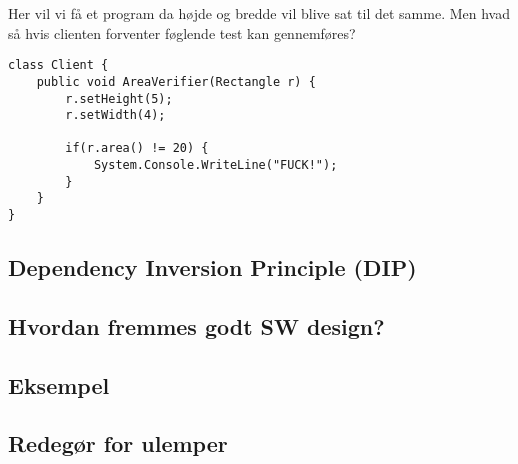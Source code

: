 Her vil vi få et program da højde og bredde vil blive sat til det samme. Men hvad så hvis clienten forventer føglende test kan gennemføres?

\begin{lstlisting}
class Client {
	public void AreaVerifier(Rectangle r) {
		r.setHeight(5);
		r.setWidth(4);
		
		if(r.area() != 20) {
			System.Console.WriteLine("FUCK!");
		}
	}
}
\end{lstlisting}



\subsection{Dependency Inversion Principle (DIP)}

\subsection{Hvordan fremmes godt SW design?}

\subsection{Eksempel}

\subsection{Redegør for ulemper}